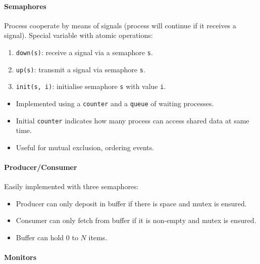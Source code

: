 \documentclass[twocolumn,english]{article}
\begin{document}
\paragraph{Semaphores}

Process cooperate by means of signals (process will continue if it
receives a signal). Special variable with atomic operations: 
\begin{enumerate}
\item \texttt{down(s)}: receive a signal via a semaphore \texttt{s}. 
\item \texttt{up(s)}: transmit a signal via semaphore \texttt{s}. 
\item \texttt{init(s, i)}: initialise semaphore \texttt{s} with value \texttt{i}. \end{enumerate}
\begin{itemize}
\item Implemented using a \texttt{counter} and a \texttt{queue} of waiting
processes. 
\item Initial \texttt{counter} indicates how many process can access shared
data at same time. 
\item Useful for mutual exclusion, ordering events. 
\end{itemize}

\paragraph{Producer/Consumer}

Easily implemented with three semaphores: 
\begin{itemize}
\item Producer can only deposit in buffer if there is space and mutex is
ensured. 
\item Consumer can only fetch from buffer if it is non-empty and mutex is
ensured. 
\item Buffer can hold $0$ to $N$ items. 
\end{itemize}

\paragraph{Monitors}
\end{document}
